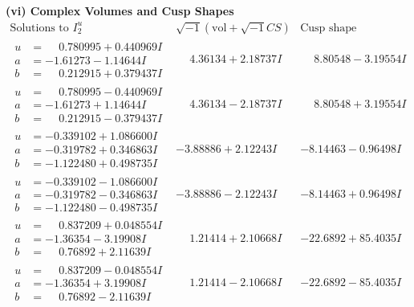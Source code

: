 \documentclass[1p]{elsarticle_modified}
\theoremstyle{definition}
\newcommand{\I}{\sqrt{-1}}
\begin{document}
\newpage\flushleft \textbf{(vi) Complex Volumes and Cusp Shapes}
$$\begin{array}{c|c|c}  
\text{Solutions to }I^u_{2}& \I (\text{vol} + \sqrt{-1}CS) & \text{Cusp shape}\\
 \hline 
\begin{aligned}
u &= \phantom{-}0.780995 + 0.440969 I \\
a &= -1.61273 - 1.14644 I \\
b &= \phantom{-}0.212915 + 0.379437 I\end{aligned}
 & \phantom{-}4.36134 + 2.18737 I & \phantom{-}8.80548 - 3.19554 I \\ \hline\begin{aligned}
u &= \phantom{-}0.780995 - 0.440969 I \\
a &= -1.61273 + 1.14644 I \\
b &= \phantom{-}0.212915 - 0.379437 I\end{aligned}
 & \phantom{-}4.36134 - 2.18737 I & \phantom{-}8.80548 + 3.19554 I \\ \hline\begin{aligned}
u &= -0.339102 + 1.086600 I \\
a &= -0.319782 + 0.346863 I \\
b &= -1.122480 + 0.498735 I\end{aligned}
 & -3.88886 + 2.12243 I & -8.14463 - 0.96498 I \\ \hline\begin{aligned}
u &= -0.339102 - 1.086600 I \\
a &= -0.319782 - 0.346863 I \\
b &= -1.122480 - 0.498735 I\end{aligned}
 & -3.88886 - 2.12243 I & -8.14463 + 0.96498 I \\ \hline\begin{aligned}
u &= \phantom{-}0.837209 + 0.048554 I \\
a &= -1.36354 - 3.19908 I \\
b &= \phantom{-}0.76892 + 2.11639 I\end{aligned}
 & \phantom{-}1.21414 + 2.10668 I & -22.6892 + 85.4035 I \\ \hline\begin{aligned}
u &= \phantom{-}0.837209 - 0.048554 I \\
a &= -1.36354 + 3.19908 I \\
b &= \phantom{-}0.76892 - 2.11639 I\end{aligned}
 & \phantom{-}1.21414 - 2.10668 I & -22.6892 - 85.4035 I \\ \hline\begin{aligned}

\end{aligned}
\end{array}$$
\end{document}
